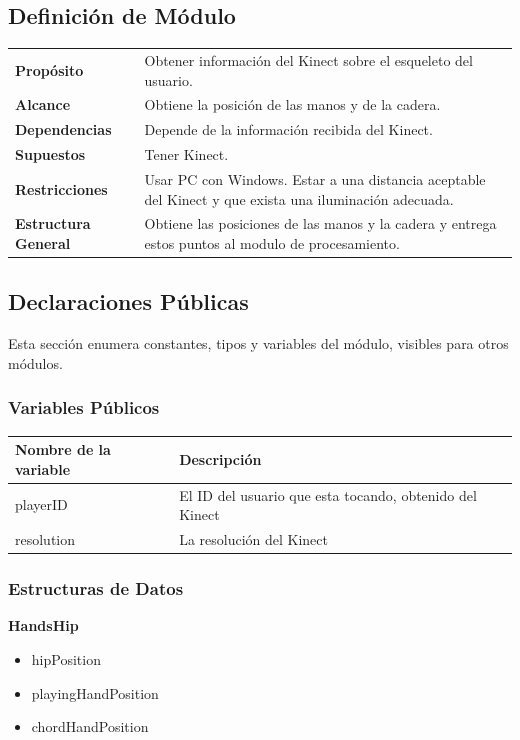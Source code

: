 \documentclass[a4paper,12pt]{article}
\begin{document}
\subsection{Definición de Módulo}
\begin{tabularx}{\textwidth}{p{25mm} X}
        \textbf{Propósito} & Obtener información del Kinect sobre el esqueleto del usuario.\\
        \textbf{Alcance} & Obtiene la posición de las manos y de la cadera.\\
        \textbf{Dependencias} & Depende de la información recibida del Kinect.\\
        \textbf{Supuestos} & Tener Kinect. \\
        \textbf{Restricciones} & Usar PC con Windows. Estar a una distancia aceptable del Kinect y que exista una iluminación adecuada.\\
        \textbf{Estructura General} & Obtiene las posiciones de las manos y la cadera y entrega estos puntos al modulo de procesamiento.\\
\end{tabularx}
\subsection{Declaraciones Públicas}
Esta sección enumera constantes, tipos y variables del módulo, visibles para
otros módulos.

\subsubsection{Variables Públicos}
\begin{tabular}{| p{30mm} | p{10cm} |}
        \hline
        \textbf{Nombre de la \mbox{variable}} & \textbf{Descripción} \\
        \hline
        playerID & El ID del usuario que esta tocando, obtenido del Kinect \\
        \hline
        resolution & La resolución del Kinect\\
        \hline
\end{tabular}
\subsubsection{Estructuras de Datos}
\textbf{HandsHip}
\begin{itemize}
        \item hipPosition
        \item playingHandPosition
        \item chordHandPosition 
\end{itemize}
\end{document}
